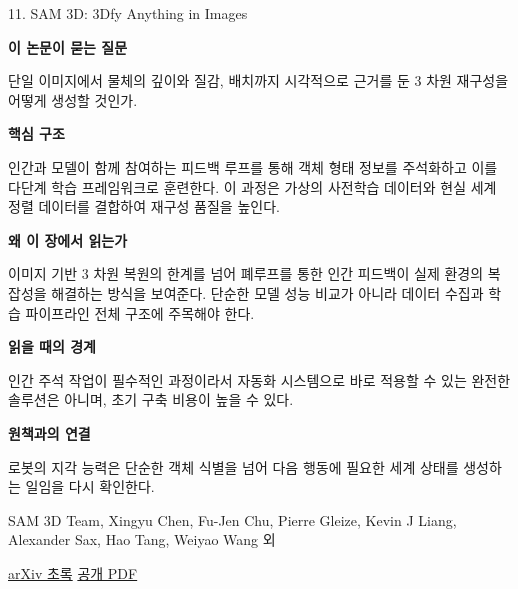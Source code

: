 \documentclass[11pt,openany]{book}
\begin{document}
\begin{termcard}{11. SAM 3D: 3Dfy Anything in Images}

\par

\medskip

{\sffamily\bfseries\color{deepblue} 이 논문이 묻는 질문}\par

단일 이미지에서 물체의 깊이와 질감, 배치까지 시각적으로 근거를 둔 3 차원 재구성을 어떻게 생성할 것인가.

\smallskip

{\sffamily\bfseries\color{deepblue} 핵심 구조}\par

인간과 모델이 함께 참여하는 피드백 루프를 통해 객체 형태 정보를 주석화하고 이를 다단계 학습 프레임워크로 훈련한다. 이 과정은 가상의 사전학습 데이터와 현실 세계 정렬 데이터를 결합하여 재구성 품질을 높인다.

\smallskip

{\sffamily\bfseries\color{deepblue} 왜 이 장에서 읽는가}\par

이미지 기반 3 차원 복원의 한계를 넘어 폐루프를 통한 인간 피드백이 실제 환경의 복잡성을 해결하는 방식을 보여준다. 단순한 모델 성능 비교가 아니라 데이터 수집과 학습 파이프라인 전체 구조에 주목해야 한다.

\smallskip

{\sffamily\bfseries\color{coral} 읽을 때의 경계}\par

인간 주석 작업이 필수적인 과정이라서 자동화 시스템으로 바로 적용할 수 있는 완전한 솔루션은 아니며, 초기 구축 비용이 높을 수 있다.

\smallskip

{\sffamily\bfseries\color{teal} 원책과의 연결}\par

로봇의 지각 능력은 단순한 객체 식별을 넘어 다음 행동에 필요한 세계 상태를 생성하는 일임을 다시 확인한다.

\medskip

{\footnotesize\color{muted} SAM 3D Team, Xingyu Chen, Fu-Jen Chu, Pierre Gleize, Kevin J Liang, Alexander Sax, Hao Tang, Weiyao Wang 외\par

\href{https://arxiv.org/abs/2511.16624}{arXiv 초록} \quad \href{https://arxiv.org/pdf/2511.16624}{공개 PDF}\par}

\end{termcard}
\end{document}
